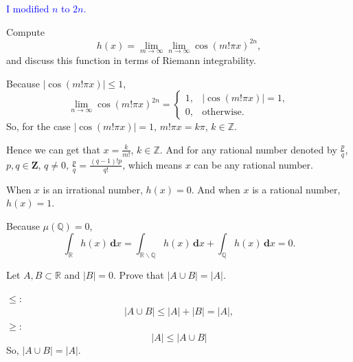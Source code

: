 \documentclass[en, normal, 11pt, black]{elegantnote}
\newenvironment{exercise}[1]{\begin{tcolorbox}[colback=black!15, colframe=black!80, breakable, title=#1]}{\end{tcolorbox}}
\renewenvironment{proof}{\begin{tcolorbox}[colback=white, colframe=black!50, breakable, title=Proof. ]\setlength{\parskip}{0.8em}}{\,\\\rightline{$\square$}\end{tcolorbox}}
\newenvironment{solution}{\begin{tcolorbox}[colback=white, colframe=black!50, breakable, title=Solution. ]\setlength{\parskip}{0.8em}}{\end{tcolorbox}}
\newcommand{\der}{\,\mathbf{d}}
\begin{document}
\begin{exercise}{(4), }
    \textcolor{blue}{I modified $n$ to $2n$. }

    Compute
    \[
        h(x)=\lim _{m \rightarrow \infty} \lim _{n \rightarrow \infty} \cos (m ! \pi x)^{2n}, 
    \]
    and discuss this function in terms of Riemann integrability.
\end{exercise}
\begin{solution}
    Because $|\cos(m!\pi x)|\leqslant1$, 
    \[
        \lim_{n\to\infty}\cos(m!\pi x)^{2n}=
        \begin{cases}
            1, & |\cos(m!\pi x)|=1, \\
            0, & \text{otherwise}. 
        \end{cases}
    \]
    So, for the case $|\cos(m!\pi x)|=1$, $m!\pi x=k\pi$, $k\in\mathbb{Z}$. 
    
    Hence we can get that $x=\frac{k}{m!}$, $k\in\mathbb{Z}$. And for any rational number denoted by $\frac{p}{q}$, $p,q\in\mathbf{Z}$, $q\not=0$, $\frac{p}{q}=\frac{(q-1)!p}{q!}$, which means $x$ can be any rational number. 
    
    When $x$ is an irrational number, $h(x)=0$.  And when $x$ is a rational number, $h(x)=1$. 

    Because $\mu(\mathbb{Q})=0$, 
    \[
        \int_\mathbb{R}h(x)\der x=\int_{\mathbb{R}\backslash\mathbb{Q}}h(x)\der x+\int_\mathbb{Q}h(x)\der x=0. 
    \]
\end{solution}

\begin{exercise}{(5), }
    Let $A, B \subset \mathbb{R}$ and $|B|=0 .$ Prove that $|A \cup B|=|A|$. 
\end{exercise}

\begin{proof}
    $\leqslant$: 
    \begin{align*}
        |A\cup B|\leqslant|A|+|B|=|A|, 
    \end{align*}
    $\geqslant$:
    \[
        |A|\leqslant|A\cup B|
    \]
    So, $|A\cup B|=|A|$. 
\end{proof}
\end{document}
